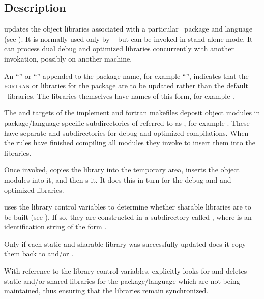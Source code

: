 \begin{synopsis}
\end{synopsis}

\subsection*{Description}

 updates the object libraries associated with a particular
\aipspp\ package and language (see ).  It is normally used only
by \aipspp\  but can be invoked in stand-alone mode.  It can
process dual debug and optimized libraries concurrently with another
invokation, possibly on another machine.

An ``'' or ``'' appended to the package name, for example
``'', indicates that the \textsc{fortran} or 
libraries for the package are to be updated rather than the default
\cplusplus\ libraries.  The libraries themselves have names of this form, for
example .

The  and  targets of the implement and fortran
makefiles deposit object modules in package/language-specific subdirectories
of  referred to as , for example
.  These have separate  and 
subdirectories for debug and optimized compilations.  When the 
rules have finished compiling all modules they invoke  to
insert them into the libraries.

Once invoked,  copies the library into the temporary area,
inserts the object modules into it, and then s it.  It does
this in turn for the debug and and optimized libraries.

 uses the library control variables to determine whether
sharable libraries are to be built (see ).  If so, they are
constructed in a subdirectory called , where  is
an identification string of the form .

Only if each static and sharable library was successfully updated does it copy
them back to  and/or .

With reference to the library control variables,  explicitly
looks for and deletes static and/or shared libraries for the package/language
which are not being maintained, thus ensuring that the libraries remain
synchronized.

